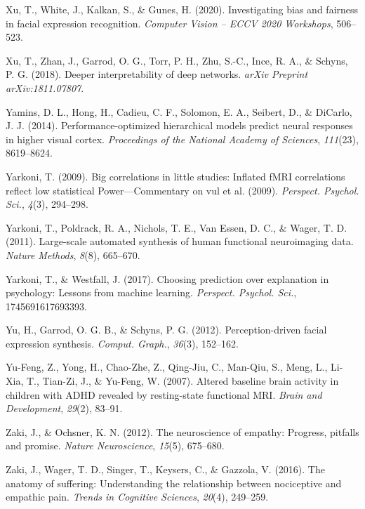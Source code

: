 \documentclass[12pt,american,a4paper,oneside,]{memoir} %
\begin{document}
\leavevmode\hypertarget{ref-Xu2020-jd}{}%
Xu, T., White, J., Kalkan, S., \& Gunes, H. (2020). Investigating bias and fairness in facial expression recognition. \emph{Computer Vision -- ECCV 2020 Workshops}, 506--523.

\leavevmode\hypertarget{ref-xu2018deeper}{}%
Xu, T., Zhan, J., Garrod, O. G., Torr, P. H., Zhu, S.-C., Ince, R. A., \& Schyns, P. G. (2018). Deeper interpretability of deep networks. \emph{arXiv Preprint arXiv:1811.07807}.

\leavevmode\hypertarget{ref-yamins2014performance}{}%
Yamins, D. L., Hong, H., Cadieu, C. F., Solomon, E. A., Seibert, D., \& DiCarlo, J. J. (2014). Performance-optimized hierarchical models predict neural responses in higher visual cortex. \emph{Proceedings of the National Academy of Sciences}, \emph{111}(23), 8619--8624.

\leavevmode\hypertarget{ref-Yarkoni2009-pz}{}%
Yarkoni, T. (2009). Big correlations in little studies: Inflated fMRI correlations reflect low statistical Power---Commentary on vul et al. (2009). \emph{Perspect. Psychol. Sci.}, \emph{4}(3), 294--298.

\leavevmode\hypertarget{ref-yarkoni2011large}{}%
Yarkoni, T., Poldrack, R. A., Nichols, T. E., Van Essen, D. C., \& Wager, T. D. (2011). Large-scale automated synthesis of human functional neuroimaging data. \emph{Nature Methods}, \emph{8}(8), 665--670.

\leavevmode\hypertarget{ref-Yarkoni2017-om}{}%
Yarkoni, T., \& Westfall, J. (2017). Choosing prediction over explanation in psychology: Lessons from machine learning. \emph{Perspect. Psychol. Sci.}, 1745691617693393.

\leavevmode\hypertarget{ref-Yu2012-ag}{}%
Yu, H., Garrod, O. G. B., \& Schyns, P. G. (2012). Perception-driven facial expression synthesis. \emph{Comput. Graph.}, \emph{36}(3), 152--162.

\leavevmode\hypertarget{ref-Yu-Feng2007-sg}{}%
Yu-Feng, Z., Yong, H., Chao-Zhe, Z., Qing-Jiu, C., Man-Qiu, S., Meng, L., Li-Xia, T., Tian-Zi, J., \& Yu-Feng, W. (2007). Altered baseline brain activity in children with ADHD revealed by resting-state functional MRI. \emph{Brain and Development}, \emph{29}(2), 83--91.

\leavevmode\hypertarget{ref-zaki2012neuroscience}{}%
Zaki, J., \& Ochsner, K. N. (2012). The neuroscience of empathy: Progress, pitfalls and promise. \emph{Nature Neuroscience}, \emph{15}(5), 675--680.

\leavevmode\hypertarget{ref-zaki2016anatomy}{}%
Zaki, J., Wager, T. D., Singer, T., Keysers, C., \& Gazzola, V. (2016). The anatomy of suffering: Understanding the relationship between nociceptive and empathic pain. \emph{Trends in Cognitive Sciences}, \emph{20}(4), 249--259.
\end{document}
